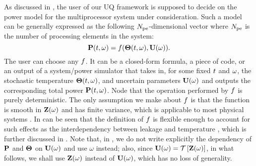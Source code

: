 As discussed in , the user of our UQ framework is supposed to decide on the power model for the multiprocessor system under consideration. Such a model can be generally expressed as the following ${N_\text{pe}}$-dimensional vector where ${N_\text{pe}}$ is the number of processing elements in the system:
\begin{equation} \elabel{power-model}
  \vP(\t, \o) = \f(\vTO(\t, \o), \vU(\o)).
\end{equation}
The user can choose any $f$. It can be a closed-form formula, a piece of code, or an output of a system/power simulator that takes in, for some fixed $t$ and $\omega$, the stochastic temperature ${\boldsymbol\Theta}(t, \omega)$, and uncertain parameters $\mathbf{U}(\omega)$ and outputs the corresponding total power $\mathbf{P}(t, \omega)$. Node that the operation performed by $f$ is purely deterministic. The only assumption we make about $f$ is that the function is smooth in $\mathbf{Z}(\omega)$ and has finite variance, which is applicable to most physical systems \cite{xiu2002}. In can be seen that the definition of $f$ is flexible enough to account for such effects as the interdependency between leakage and temperature \cite{srivastava2010, liu2007}, which is further discussed in . Note that, in , we do not write explicitly the dependency of $\mathbf{P}$ and ${\boldsymbol\Theta}$ on $\mathbf{U}(\omega)$ and use $\omega$ instead; also, since $\vU(\o) = \oTransform{\vZ(\o)}$, in what follows, we shall use $\mathbf{Z}(\omega)$ instead of $\mathbf{U}(\omega)$, which has no loss of generality.
